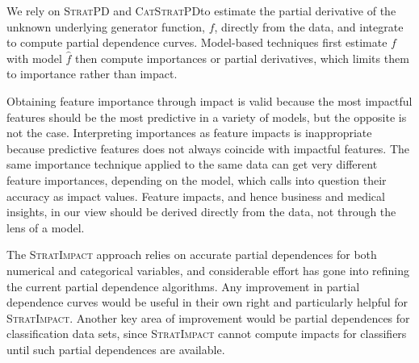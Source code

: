 \documentclass[11pt]{article}
\newcommand{\todo}[1]{{{\small\color{red}{[#1]}}}}
\newcommand{\simp}{\fontfamily{cmr}\textsc{\small StratImpact}}
\newcommand{\spd}{\fontfamily{cmr}\textsc{\small StratPD}}
\newcommand{\cspd}{\fontfamily{cmr}\textsc{\small CatStratPD}}
\begin{document}
\todo{too sensitive on hyper params than we'd like. likes a lot of data, though works for boston. ntrials can help}

We rely on \spd{} and \cspd to estimate the partial derivative of the unknown underlying generator function, $f$, directly from the data, and integrate to compute partial dependence curves. Model-based techniques first estimate $f$ with model $\hat{f}$ then compute importances or partial derivatives, which limits them to importance rather than impact.
 


Obtaining feature importance through impact is valid because the most impactful features should be the most predictive in a variety of models, but the opposite is not the case.   Interpreting importances as feature impacts is inappropriate because predictive features does not always coincide with impactful features.  The same importance technique applied to the same data can get very different feature importances, depending on the model, which calls into question their accuracy as impact values.  Feature impacts, and hence business and medical insights,  in our view should be derived directly from the data, not through the lens of a model.





\todo{ interrogating OLS to get rankings then using a more powerful model is worth exploring.}

The \simp{} approach relies on accurate partial dependences for both numerical and categorical variables, and considerable effort has gone into refining the current partial dependence algorithms.  Any improvement in partial dependence curves would be useful in their own right and particularly helpful for \simp.   Another key area of improvement would be partial dependences for classification data sets, since \simp{} cannot compute impacts for classifiers until such partial dependences are available.
\end{document}

